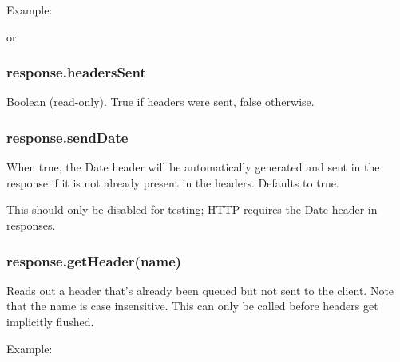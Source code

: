 Example:

\begin{Shaded}
\begin{Highlighting}[]
\NormalTok{(}\NormalTok{, }\NormalTok{);}
\end{Highlighting}
\end{Shaded}

or

\begin{Shaded}
\begin{Highlighting}[]
\NormalTok{(}\NormalTok{, [}\NormalTok{, }\NormalTok{]);}
\end{Highlighting}
\end{Shaded}

\subsubsection{response.headersSent}\label{response.headerssent}

Boolean (read-only). True if headers were sent, false otherwise.

\subsubsection{response.sendDate}\label{response.senddate}

When true, the Date header will be automatically generated and sent in
the response if it is not already present in the headers. Defaults to
true.

This should only be disabled for testing; HTTP requires the Date header
in responses.

\subsubsection{response.getHeader(name)}\label{response.getheadername}

Reads out a header that's already been queued but not sent to the
client. Note that the name is case insensitive. This can only be called
before headers get implicitly flushed.

Example:

\begin{Shaded}
\begin{Highlighting}[]
 \NormalTok{(}\NormalTok{);}
\end{Highlighting}
\end{Shaded}

